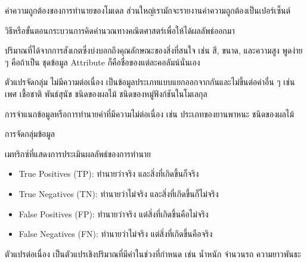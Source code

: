 \begin{description}[style=nextline]
    \item[Accuracy] ค่าความถูกต้องของการทำนายของโมเดล ส่วนใหญ่เรามักจะรายงานค่าความถูกต้องเป็นเปอร์เซ็นต์

    \item[Algorithm] วิธีหรือขั้นตอนกระบวนการคิดคำนวณทางคณิตศาสตร์เพื่อให้ได้ผลลัพธ์ออกมา

    \item[Attribute] ปริมาณที่ได้จากการสังเกตซึ่งบ่งบอกถึงคุณลักษณะของสิ่งที่สนใจ เช่น สี, ขนาด, และความสูง พูดง่าย ๆ คือถ้าเป็น%
    ชุดข้อมูล Attribute ก็คือชื่อของแต่ละคอลัมน์นั่นเอง

    \item[Categorical Variables] ตัวแปรจัดกลุ่ม ไม่มีความต่อเนื่อง เป็นข้อมูลประเภทแบบแยกออกจากกันและไม่ขึ้นต่อค่าอื่น ๆ เช่น 
    เพศ เชื้อชาติ พันธ์สุนัข ชนิดของผลไม้ ชนิดของหมู่ฟังก์ชันในโมเลกุล

    \item[Classification] การจำแนกข้อมูลหรือการทำนายค่าที่มีความไม่ต่อเนื่อง เช่น ประเภทของยานพาหนะ ชนิดของผลไม้
 
    \item[Clustering] การจัดกลุ่มข้อมูล

    \item[Confusion matrix] เมทริกซ์ที่แสดงการประเมินผลลัพธ์ของการทำนาย
    \begin{itemize}
        \item True Positives (TP): ทำนายว่าจริง และสิ่งที่เกิดขึ้นก็จริง
        
        \item True Negatives (TN): ทำนายว่าไม่จริง และสิ่งที่เกิดขึ้นก็ไม่จริง
        
        \item False Positives (FP): ทำนายว่าจริง แต่สิ่งที่เกิดขึ้นคือไม่จริง
        
        \item False Negatives (FN): ทำนายว่าไม่จริง แต่สิ่งที่เกิดขึ้นคือจริง
    \end{itemize}

    \item[Continuous Variables] ตัวแปรต่อเนื่อง เป็นตัวแปรเชิงปริมาณที่มีค่าในช่วงที่กำหนด เช่น น้ำหนัก จำนวนรถ ความยาวพันธะ


\end{description}
